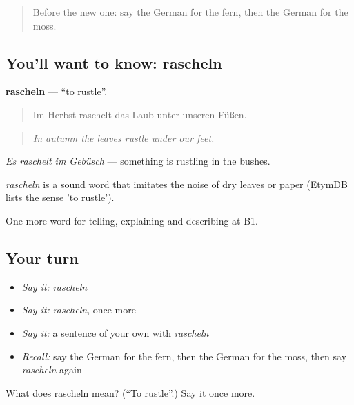 \label{lesson:GE-C456-rascheln}



\begin{quote}
Before the new one: say the German for the fern, then the German for the moss.
\end{quote}

\subsection*{You'll want to know: rascheln}
\textbf{rascheln} — \textquotedblleft{}to rustle\textquotedblright{}.

\begin{quote}
Im Herbst raschelt das Laub unter unseren Füßen.
\end{quote}

\begin{quote}
\emph{In autumn the leaves rustle under our feet.}
\end{quote}

\emph{Es raschelt im Gebüsch} — something is rustling in the bushes.

\begin{cousinweb}
\emph{rascheln} is a sound word that imitates the noise of dry leaves or paper (EtymDB lists the sense 'to rustle').
\end{cousinweb}

\begin{grammarlens}[title={What you've built}]
One more word for telling, explaining and describing at B1.
\end{grammarlens}

\subsection*{Your turn}
\begin{itemize}
\raggedright
  \item \emph{Say it:} \emph{rascheln}
  \item \emph{Say it:} \emph{rascheln}, once more
  \item \emph{Say it:} a sentence of your own with \emph{rascheln}
  \item \emph{Recall:} say the German for the fern, then the German for the moss, then say \emph{rascheln} again
\end{itemize}

\begin{tcolorbox}[breakable,colback=teal!4,colframe=teal!35!black,title={Before you move on}]
What does rascheln mean? (\textquotedblleft{}To rustle\textquotedblright{}.) Say it once more.
\end{tcolorbox}
